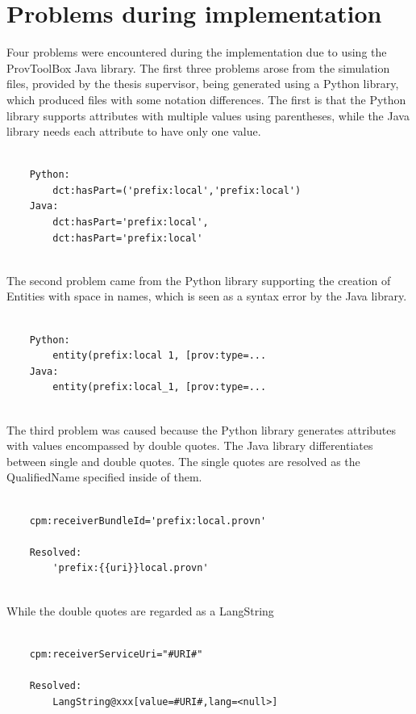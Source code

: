\documentclass[
  digital,     %
  oneside,     %
  nosansbold,  %
  nocolorbold, %
  lof,         %
  lot,         %
]{fithesis4}
\begin{document}
\section{Problems during implementation}
Four problems were encountered during the implementation due to using the ProvToolBox Java library. The first three problems arose from the simulation files, provided by the thesis supervisor, being generated using a Python library, which produced files with some notation differences. The first is that the Python library supports attributes with multiple values using parentheses, while the Java library needs each attribute to have only one value.

\begin{verbatim}

    Python: 
        dct:hasPart=('prefix:local','prefix:local')
    Java:
        dct:hasPart='prefix:local', 
        dct:hasPart='prefix:local' 
        
\end{verbatim}

The second problem came from the Python library supporting the creation of Entities with space in names, which is seen as a syntax error by the Java library.

\begin{verbatim}

    Python:
        entity(prefix:local 1, [prov:type=...
    Java:
        entity(prefix:local_1, [prov:type=... 
        
\end{verbatim}

The third problem was caused because the Python library generates attributes with values encompassed by double quotes. The Java library differentiates between single and double quotes. The single quotes are resolved as the QualifiedName specified inside of them.

\begin{verbatim}

    cpm:receiverBundleId='prefix:local.provn'
    
    Resolved:
        'prefix:{{uri}}local.provn'
        
\end{verbatim}

While the double quotes are regarded as a LangString

\begin{verbatim}

    cpm:receiverServiceUri="#URI#"
    
    Resolved:
        LangString@xxx[value=#URI#,lang=<null>]
        
\end{verbatim}
\end{document}
